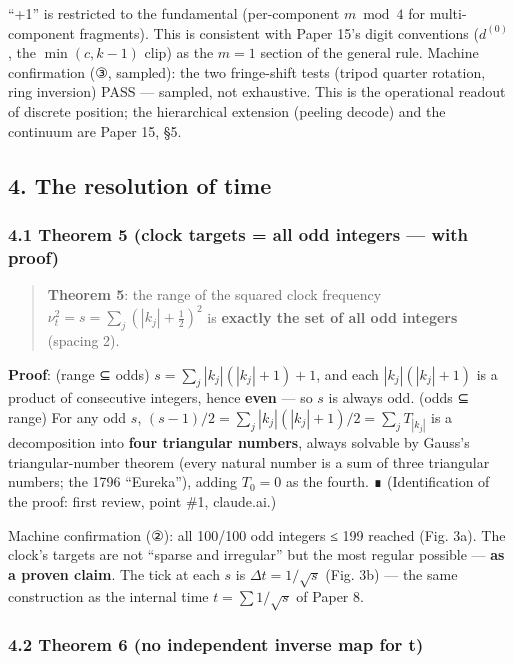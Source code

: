 \documentclass[
]{ltjsarticle}
\begin{document}
``+1'' is restricted to the fundamental (per-component \(m\bmod4\) for
multi-component fragments). This is consistent with Paper 15's digit
conventions (\(d^{(0)}\), the \(\min(c,k{-}1)\) clip) as the \(m=1\)
section of the general rule. Machine confirmation (③, sampled): the two
fringe-shift tests (tripod quarter rotation, ring inversion) PASS ---
sampled, not exhaustive. This is the operational readout of discrete
position; the hierarchical extension (peeling decode) and the continuum
are Paper 15, §5.

\subsection{4. The resolution of time}\label{the-resolution-of-time}

\subsubsection{4.1 Theorem 5 (clock targets = all odd integers --- with
proof)}\label{theorem-5-clock-targets-all-odd-integers-with-proof}

\begin{quote}
\textbf{Theorem 5}: the range of the squared clock frequency
\(\nu_t^2=s=\sum_j(|k_j|+\tfrac12)^2\) is \textbf{exactly the set of all
odd integers} (spacing 2).
\end{quote}

\textbf{Proof}: (range ⊆ odds) \(s=\sum_j|k_j|(|k_j|+1)+1\), and each
\(|k_j|(|k_j|+1)\) is a product of consecutive integers, hence
\textbf{even} --- so \(s\) is always odd. (odds ⊆ range) For any odd
\(s\), \((s-1)/2=\sum_j|k_j|(|k_j|+1)/2=\sum_j T_{|k_j|}\) is a
decomposition into \textbf{four triangular numbers}, always solvable by
Gauss's triangular-number theorem (every natural number is a sum of
three triangular numbers; the 1796 ``Eureka''), adding \(T_0=0\) as the
fourth. ∎ (Identification of the proof: first review, point \#1,
claude.ai.)

Machine confirmation (②): all 100/100 odd integers ≤ 199 reached (Fig.
3a). The clock's targets are not ``sparse and irregular'' but the most
regular possible --- \textbf{as a proven claim}. The tick at each \(s\)
is \(\Delta t=1/\sqrt{s}\) (Fig. 3b) --- the same construction as the
internal time \(t=\sum1/\sqrt{s}\) of Paper 8.

\subsubsection{4.2 Theorem 6 (no independent inverse map for
t)}\label{theorem-6-no-independent-inverse-map-for-t}
\end{document}
